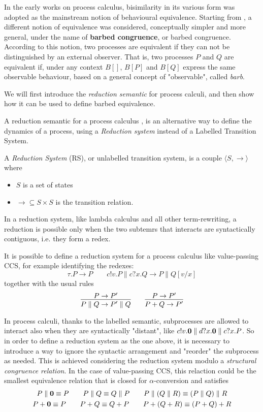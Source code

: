 In the early works on process calculus, bisimilarity in its various form was adopted as the mainstream notion of behavioural equivalence. Starting from \cite{milnerBarbedBisimulation1992}, a different notion of equivalence was considered, conceptually simpler and more general, under the name
of \textbf{barbed congruence}, or barbed congruence. According to this notion, two processes are equivalent if they can not be distinguished by an external observer. That is, two processes $P$ and $Q$ are equivalent if, under any context $B[]$, $B[P]$ and $B[Q]$ express the same observable behaviour, based on a general concept of "observable", called \textit{barb}.

We will first introduce the \textit{reduction semantic} for process calculi, and then show how it can be used to define barbed equivalence. 

A reduction semantic for a process calculus \cite{milnerFunctionsProcesses1990, berryChemicalAbstractMachine1989}, is an alternative way to define the dynamics of a process, using a \textit{Reduction system} instead of a Labelled Transition System. 

A \textit{Reduction System} (RS), or unlabelled transition system, is a couple $\langle S,  \rightarrow \rangle$ where \begin{itemize}
\item $S$ is a set of states
\item $\rightarrow 	\subseteq S\times S$ is the transition relation.
\end{itemize} 

In a reduction system, like lambda calculus and all other term-rewriting, a reduction is possible only when the two subtemrs that interacts are syntactically contiguous, i.e. they form a redex. 

It is possible to define a reduction system for a process calculus like value-passing CCS, for example identifying the redexes:
\[ \tau.P \rightarrow P \qquad c!v.P \parallel c?x.Q \rightarrow P \parallel Q[v/x]\]
together with the usual rules
\[ \infer{P \parallel Q \rightarrow P'\parallel Q}{P \rightarrow P'}
\qquad
\infer{P + Q \rightarrow P'}{P \rightarrow P'}\]

In process calculi, thanks to the labelled semantic, subprocesses are allowed to interact also when they are syntactically "distant", like $c!v.\mathbf{0} \parallel d?x.\mathbf{0} \parallel c?x.P$. So in order to define a reduction system as the one above, it is necessary to introduce a way to ignore the syntactic arrangement and "reorder" the subprocess as needed.  This is achieved considering the reduction system modulo a \textit{structural congruence relation}. In the case of value-passing CCS, this relaction could be the smallest equivalence relation that is closed for $\alpha$-conversion and satisfies  
\begin{gather*}
P\parallel\mathbf{0} \equiv P \qquad P\parallel Q \equiv Q \parallel P \qquad P\parallel(Q\parallel R) \equiv (P \parallel Q) \parallel R \\
P + \mathbf{0} \equiv P \qquad P + Q \equiv Q + P \qquad P + (Q + R) \equiv (P + Q) + R
\end{gather*}

